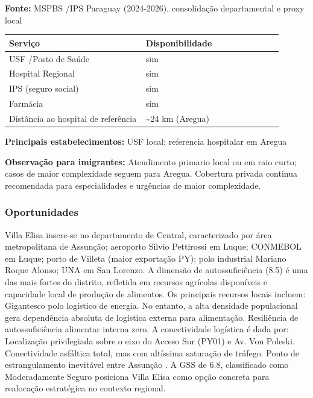 \textbf{Fonte:} MSPBS /\allowbreak  IPS Paraguay (2024-2026), consolidação
departamental e proxy local

{\def\LTcaptype{none} %
\begin{longtable}{@{}>{\raggedright\arraybackslash}p{0.45\linewidth} >{\raggedright\arraybackslash}p{0.45\linewidth}@{}}
\toprule\noalign{}
Serviço & Disponibilidade \\
\midrule\noalign{}
\endhead
\bottomrule\noalign{}
\endlastfoot
USF /\allowbreak  Posto de Saúde & sim \\
Hospital Regional & sim \\
IPS (seguro social) & sim \\
Farmácia & sim \\
Distância ao hospital de referência & \textasciitilde24 km (Aregua) \\
\end{longtable}
}

\textbf{Principais estabelecimentos:} USF local; referencia hospitalar
em Aregua

\textbf{Observação para imigrantes:} Atendimento primario local ou em
raio curto; casos de maior complexidade seguem para Aregua. Cobertura
privada continua recomendada para especialidades e urgências de maior
complexidade.
\newpage

\subsubsection*{Oportunidades}\label{oport-villa-elisa-1115}
Villa Elisa insere-se no departamento de Central, caracterizado por área metropolitana de Assunção; aeroporto Silvio Pettirossi em Luque; CONMEBOL em Luque; porto de Villeta (maior exportação PY); polo industrial Mariano Roque Alonso; UNA em San Lorenzo. A dimensão de autossuficiência (8.5) é uma das mais fortes do distrito, refletida em recursos agrícolas disponíveis e capacidade local de produção de alimentos. Os principais recursos locais incluem: Gigantesco polo logístico de energia. No entanto, a alta densidade populacional gera dependência absoluta de logística externa para alimentação. Resiliência de autossuficiência alimentar interna zero. A conectividade logística é dada por: Localização privilegiada sobre o eixo do Acceso Sur (PY01) e Av. Von Poleski. Conectividade asfáltica total, mas com altíssima saturação de tráfego. Ponto de estrangulamento inevitável entre Assunção . A GSS de 6.8, classificado como Moderadamente Seguro posiciona Villa Elisa como opção concreta para realocação estratégica no contexto regional.

